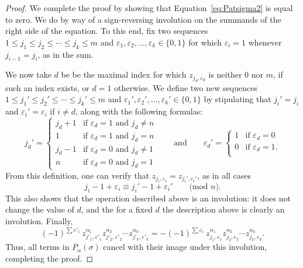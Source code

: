 \documentclass[12pt]{amsart}
\theoremstyle{definition}
\theoremstyle{remark}
\numberwithin{equation}{section}
\renewcommand{\epsilon}{\varepsilon}
\begin{document}
\begin{proof}
We complete the proof by showing that Equation~\eqref{eq:Patsigma2} is equal to zero.  We do by way of a sign-reversing involution on the summands of the right side of the equation.  To this end, fix two sequences $1\le j_1\le j_2\le\cdots\le j_k\le m$ and $\epsilon_1,\epsilon_2,\ldots,\epsilon_k \in \{0, 1\}$ for which $\epsilon_{i} = 1$ whenever $j_{i-1} = j_{i}$, as in the sum.  

We now take $d$ be be the maximal index for which $z_{j_{d}, \epsilon_{d}}$ is neither $0$ nor $m$, if such an index exists, or $d = 1$ otherwise.  We define two new sequences $1\le j_1'\le j_2'\le\cdots\le j_k'\le m$ and $\epsilon_1',\epsilon_2',\ldots,\epsilon_k' \in \{0,  1\}$ by stipulating that $j_{i}' = j_{i}$ and $\epsilon_{i}' = \epsilon_{i}$ if $i \neq d$, along with the following formulas:
\[
j_{d}' = \begin{cases} 
j_{d} + 1 & \text{if $\epsilon_{d} = 1$ and $j_{d} \neq n$} \\ 
1 & \text{if $\epsilon_{d} = 1$ and $j_{d} = n$} \\
j_{d} - 1 & \text{if $\epsilon_{d} = 0$ and $j_{d} \neq 1$} \\
n & \text{if $\epsilon_{d} = 0$ and $j_{d} = 1$}
\end{cases}
\qquad\text{and}\qquad
\epsilon_{d}' = \begin{cases}
1 & \text{if $\epsilon_{d} = 0$} \\ 
0 & \text{if $\epsilon_{d} = 1$.} \\ 
\end{cases}
\]
From this definition, one can verify that $z_{j_{i}, \epsilon_{i}} = z_{j_{i}', \epsilon_{i}'}$, as in all cases 
\[
j_{i} - 1 + \epsilon_{i} \equiv j_{i}' - 1 + \epsilon_{i}' \qquad \text{(mod $n$)}.
\]
This also shows that the operation described above is an involution: it does not change the value of $d$, and the for a fixed $d$ the description above is clearly an involution.  Finally, 
\[
(-1)^{\sum \epsilon'_i}\ z_{j'_1,\epsilon'_1}^{\alpha_1}z_{j'_2,\epsilon'_2}^{\alpha_2} \cdots z_{j'_k,\epsilon'_k}^{\alpha_k}
  = - (-1)^{\sum \epsilon_i}\ z_{j_1,\epsilon_1}^{\alpha_1}z_{j_2,\epsilon_2}^{\alpha_2} \cdots z_{j_k,\epsilon_k}^{\alpha_k}.
\]
Thus, all terms in $P_{\alpha}(\sigma)$ cancel with their image under this involution, completing the proof.
\end{proof}
\end{document}
